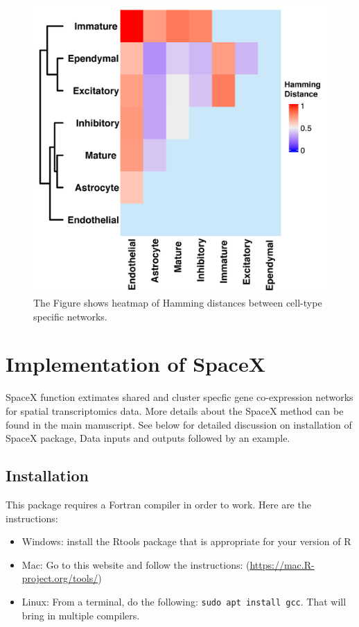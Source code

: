\documentclass[
]{book}
\begin{document}
\begin{figure}

{\centering \includegraphics[width=0.6\linewidth]{images/Hamming_distance_Merfish} 

}

\caption{The Figure shows heatmap of Hamming distances between cell-type specific networks.}\label{fig:hammDist}
\end{figure}

\hypertarget{ImplementSpaceX}{%
\chapter{Implementation of SpaceX}\label{ImplementSpaceX}}

SpaceX function extimates shared and cluster specfic gene co-expression networks for spatial transcriptomics data. More details about the SpaceX method can be found in the main manuscript. See below for detailed discussion on installation of SpaceX package, Data inputs and outputs followed by an example.

\hypertarget{installation}{%
\section{Installation}\label{installation}}

This package requires a Fortran compiler in order to work. Here are the instructions:

\begin{itemize}
\item
  Windows: install the Rtools package that is appropriate for your version of R
\item
  Mac: Go to this website and follow the instructions: (\url{https://mac.R-project.org/tools/})
\item
  Linux: From a terminal, do the following: \texttt{sudo\ apt\ install\ gcc}. That will bring in multiple compilers.
\end{itemize}
\end{document}
